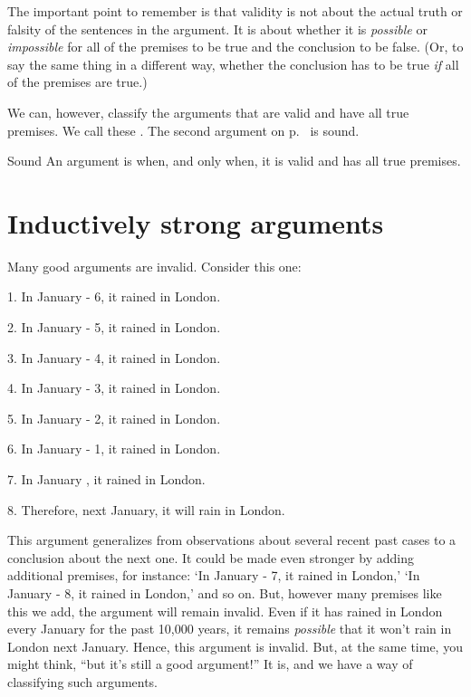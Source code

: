 The important point to remember is that validity is not about the actual truth or falsity of the sentences in the argument. It is about whether it is \emph{possible} or \emph{impossible} for all of the premises to be true and the conclusion to be false. (Or, to say the same thing in a different way, whether the conclusion has to be true \textit{if} all of the premises are true.)

We can, however, classify the arguments that are valid and have all true premises. We call these \label{def-sound-arg}. The second argument on p.~\pageref{valid-bananas} is sound.

\begin{factboxy}{Sound}
An argument is  when, and only when, it is valid and has all true premises.
\end{factboxy}


\section{Inductively strong arguments}
Many good arguments are invalid. Consider this one:
	\begin{earg}
		\item[1.] In January \the\numexpr \year - 6, it rained in London.
		\item[2.] In January \the\numexpr \year - 5, it rained in London.
		\item[3.] In January \the\numexpr \year - 4, it rained in London.
		\item[4.] In January \the\numexpr \year - 3, it rained in London.
		\item[5.] In January \the\numexpr \year - 2, it rained in London.
		\item[6.] In January \the\numexpr \year - 1, it rained in London.
		\item[7.] In January \the\year{}, it rained in London.
	\item[8.] Therefore, next January, it will rain in London.
\end{earg}

This argument generalizes from observations about several recent past cases to a conclusion about the next one. It could be made even stronger by adding additional premises, for instance: `In January \the\numexpr \year - 7, it rained in London,' `In January \the\numexpr \year - 8, it rained in London,' and so on. But, however many premises like this we add, the argument will remain invalid. Even if it has rained in London every January for the past 10,000 years, it remains \emph{possible} that it won't rain in London next January. Hence, this argument is invalid. But, at the same time, you might think, ``but it's still a good argument!'' It is, and we have a way of classifying such arguments.


